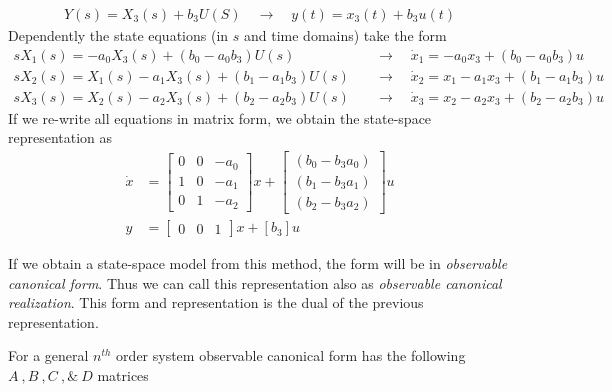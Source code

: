 \documentclass[twoside]{article}
\begin{document}
%
\begin{align*}
	Y(s) = X_3(s) + b_3 U(S) \quad \rightarrow \quad y(t) = x_3(t) + b_3 u(t)
\end{align*}
% 
Dependently the state equations (in $s$ and time domains) take the form
%
%
\begin{align*}
s X_1(s) = -a_0 X_3(s)  + ( b_0 - a_0 b_3) U(s) \quad &\rightarrow \quad \dot{x}_1 = -a_0 x_3  + ( b_0 - a_0 b_3) u
\\
s X_2(s) = X_1(s)  -a_1 X_3(s) + ( b_1 - a_1 b_3 ) U(s)  \quad &\rightarrow \quad \dot{x}_2 = x_1  - a_1 x_3 + ( b_1 - a_1 b_3 ) u
\\
s X_3(s) = X_2(s)  -a_2 X_3(s) + ( b_2 - a_2 b_3 ) U(s)  \quad &\rightarrow \quad \dot{x}_3 = x_2  - a_2 x_3 + ( b_2 - a_2 b_3 ) u
\end{align*}
%
If we re-write all equations in matrix form, we obtain the state-space representation as
%
\begin{align*}
	\dot{x} &= \left[ \begin{array}{ccc} 0 & 0 & -a_0  \\  1 & 0 & -a_1 \\  0 & 1 & -a_2 \end{array} \right] x 
	+ \left[ \begin{array}{c} ( b_0 - b_3 a_0 ) \\ ( b_1 - b_3 a_1 ) \\ ( b_2 - b_3 a_2 ) \end{array} \right] u
	\\
	y &= \left[ \begin{array}{ccc} 0 & 0  & 1 \end{array} \right] x
	+ \left[ b_3 \right] u
\end{align*}

If we obtain a state-space model from this method, the form
will be in \textit{observable canonical form}. Thus we can call this representation also as 
\textit{observable canonical realization}. This form and
representation is the dual of the previous representation. 

For a general $n^{th}$ order system observable
canonical form has the following $A \ ,  B \ ,  C \ , \& \ D$
matrices
\end{document}

